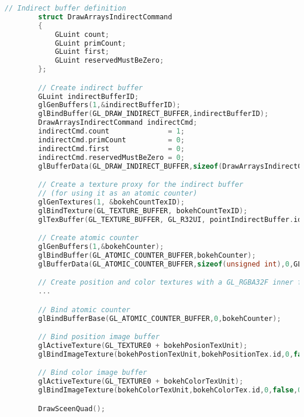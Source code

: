 \begin{lstlisting}[language=C++,float={htb},caption={Host application for extracting \bokehs \emph{(Pass 2)}.},label={Derousiers:bokehextractioncpp}]
		// Indirect buffer definition
		struct DrawArraysIndirectCommand
		{
			GLuint count;
			GLuint primCount;
			GLuint first;
			GLuint reservedMustBeZero;
		};

		// Create indirect buffer
		GLuint indirectBufferID;
		glGenBuffers(1,&indirectBufferID);
		glBindBuffer(GL_DRAW_INDIRECT_BUFFER,indirectBufferID);
		DrawArraysIndirectCommand indirectCmd;
		indirectCmd.count              = 1;
		indirectCmd.primCount          = 0;
		indirectCmd.first              = 0;
		indirectCmd.reservedMustBeZero = 0;
		glBufferData(GL_DRAW_INDIRECT_BUFFER,sizeof(DrawArraysIndirectCommand),&indirecCmd,GL_DYNAMIC_DRAW);

		// Create a texture proxy for the indirect buffer 
		// (for using it as an atomic counter)
		glGenTextures(1, &bokehCountTexID);
		glBindTexture(GL_TEXTURE_BUFFER, bokehCountTexID);
		glTexBuffer(GL_TEXTURE_BUFFER, GL_R32UI, pointIndirectBuffer.id);

		// Create atomic counter
		glGenBuffers(1,&bokehCounter);
		glBindBuffer(GL_ATOMIC_COUNTER_BUFFER,bokehCounter);
		glBufferData(GL_ATOMIC_COUNTER_BUFFER,sizeof(unsigned int),0,GL_DYNAMIC_DRAW);

		// Create position and color textures with a GL_RGBA32F inner format
		...

		// Bind atomic counter
		glBindBufferBase(GL_ATOMIC_COUNTER_BUFFER,0,bokehCounter);

		// Bind position image buffer
		glActiveTexture(GL_TEXTURE0 + bokehPosionTexUnit);
		glBindImageTexture(bokehPostionTexUnit,bokehPositionTex.id,0,false,0,GL_WRITE_ONLY,GL_RGBA32F);

		// Bind color image buffer
		glActiveTexture(GL_TEXTURE0 + bokehColorTexUnit);
		glBindImageTexture(bokehColorTexUnit,bokehColorTex.id,0,false,0,GL_WRITE_ONLY,GL_RGBA32F);

		DrawSceenQuad();
\end{lstlisting}


